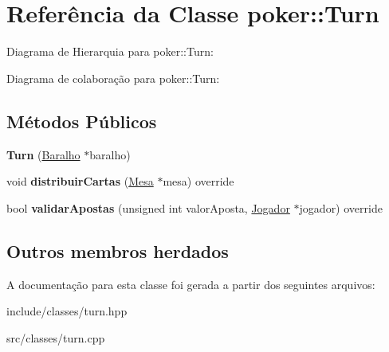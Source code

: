 \hypertarget{classpoker_1_1Turn}{}\section{Referência da Classe poker\+:\+:Turn}
\label{classpoker_1_1Turn}


Diagrama de Hierarquia para poker\+:\+:Turn\+:


Diagrama de colaboração para poker\+:\+:Turn\+:
\subsection*{Métodos Públicos}
\begin{DoxyCompactItemize}
\item 
\mbox{\label{classpoker_1_1Turn_a555b173f5cb66902bdd0ae31c99fc9c3}} 
{\bfseries Turn} (\hyperlink{classpoker_1_1Baralho}{Baralho} $\ast$baralho)
\item 
\mbox{\label{classpoker_1_1Turn_afd575d452aec25b64855a1f256ad47e1}} 
void {\bfseries distribuir\+Cartas} (\hyperlink{classpoker_1_1Mesa}{Mesa} $\ast$mesa) override
\item 
\mbox{\label{classpoker_1_1Turn_a6825adfe690dea0f959e9349e107b6d3}} 
bool {\bfseries validar\+Apostas} (unsigned int valor\+Aposta, \hyperlink{classpoker_1_1Jogador}{Jogador} $\ast$jogador) override
\end{DoxyCompactItemize}
\subsection*{Outros membros herdados}


A documentação para esta classe foi gerada a partir dos seguintes arquivos\+:\begin{DoxyCompactItemize}
\item 
include/classes/turn.\+hpp\item 
src/classes/turn.\+cpp\end{DoxyCompactItemize}
